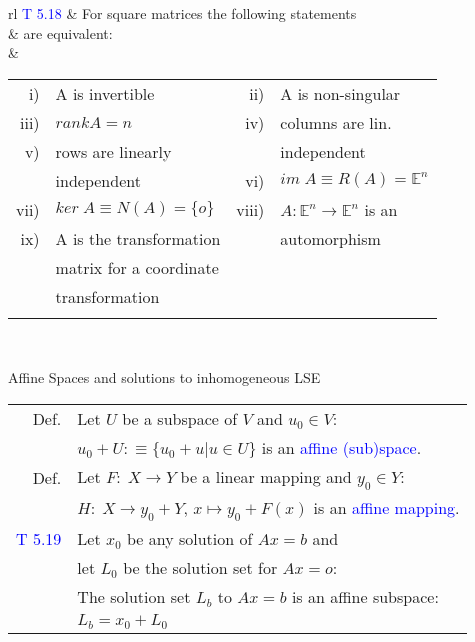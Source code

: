 \begin{mainbox}{}
\setlength{\tabcolsep}{2pt}
\begin{tabular}{rl}
	\textcolor{blue}{T 5.18} & For square matrices the following statements\\
	& are equivalent:\\
	& \begin{tabular}{rlrl}
		i) & A is invertible & ii) & A is non-singular \\
		\rule{0pt}{2ex}
		iii) & $rankA = n$ & iv) & columns are lin.\\
		\rule{0pt}{2ex}
		v) & rows are linearly & & independent\\
		\rule{0pt}{2ex}		
		& independent & vi) & $im\;A \equiv R(A) = \mathbb{E}^n$\\
		\rule{0pt}{2ex}
		vii) & $ker\;A \equiv N(A) = \{o\}$ & viii) & $A:\mathbb{E}^n\rightarrow\mathbb{E}^n$ is an\\
		\rule{0pt}{2ex}
		ix) & A is the transformation & & automorphism\\
		\rule{0pt}{2ex}
		& matrix for a coordinate & & \\
		\rule{0pt}{2ex}
		& transformation & & \\
		\rule{0pt}{2ex}
	\end{tabular}\\
\end{tabular}
\end{mainbox}

\begin{subbox}{Affine Spaces and solutions to inhomogeneous LSE}
\setlength{\tabcolsep}{2pt}
\begin{tabular}{rl}
	Def. & Let $U$ be a subspace of $V$ and $u_0 \in V$:\\
	& $u_0 + U :\equiv \{u_0 + u | u\in U\}$ is an \textcolor{blue}{affine (sub)space}.\\
	\rule{0pt}{3ex}
	Def. & Let $F:\;X\rightarrow Y$ be a linear mapping and $y_0 \in Y$:\\
	& $H:\;X\rightarrow y_0+Y$, $x\mapsto y_0 + F(x)$ is an \textcolor{blue}{affine mapping}.\\
	\rule{0pt}{3ex}
	\textcolor{blue}{T 5.19} & Let $x_0$ be any solution of $Ax = b$ and\\
	& let $L_0$ be the solution set for $Ax = o$: \\
	& The solution set $L_b$ to $Ax = b$ is an affine subspace:\\
	& $L_b = x_0 + L_0$\\
\end{tabular}
\end{subbox}

